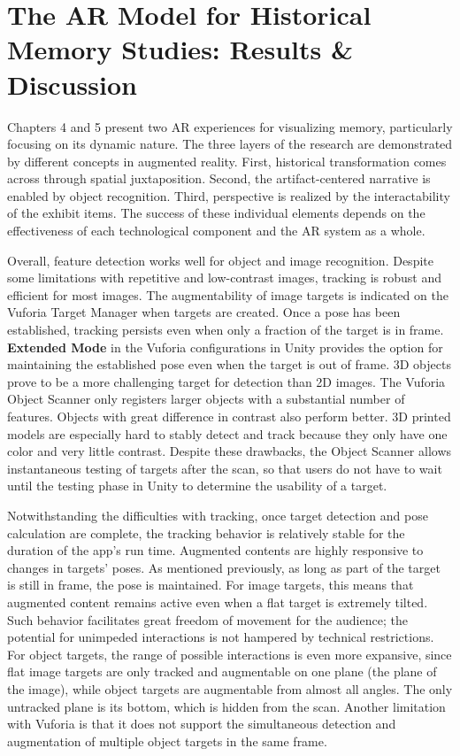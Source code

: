\chapter[The AR Model for Historical Memory Studies]{The AR Model for Historical Memory Studies: Results \& Discussion}\label{results}
Chapters 4 and 5 present two AR experiences for visualizing memory, particularly focusing on its dynamic nature. The three layers of the research are demonstrated by different concepts in augmented reality. First, historical transformation comes across through spatial juxtaposition. Second, the artifact-centered narrative is enabled by object recognition. Third, perspective is realized by the interactability of the exhibit items. The success of these individual elements depends on the effectiveness of each technological component and the AR system as a whole.

Overall, feature detection works well for object and image recognition. Despite some limitations with repetitive and low-contrast images, tracking is robust and efficient for most images. The augmentability of image targets is indicated on the Vuforia Target Manager when targets are created. Once a pose has been established, tracking persists even when only a fraction of the target is in frame. \textbf{Extended Mode} in the Vuforia configurations in Unity provides the option for maintaining the established pose even when the target is out of frame. 3D objects prove to be a more challenging target for detection than 2D images. The Vuforia Object Scanner only registers larger objects with a substantial number of features. Objects with great difference in contrast also perform better. 3D printed models are especially hard to stably detect and track because they only have one color and very little contrast. Despite these drawbacks, the Object Scanner allows instantaneous testing of targets after the scan, so that users do not have to wait until the testing phase in Unity to determine the usability of a target.

Notwithstanding the difficulties with tracking, once target detection and pose calculation are complete, the tracking behavior is relatively stable for the duration of the app's run time. Augmented contents are highly responsive to changes in targets' poses. As mentioned previously, as long as part of the target is still in frame, the pose is maintained. For image targets, this means that augmented content remains active even when a flat target is extremely tilted. Such behavior facilitates great freedom of movement for the audience; the potential for unimpeded interactions is not hampered by technical restrictions. For object targets, the range of possible interactions is even more expansive, since flat image targets are only tracked and augmentable on one plane (the plane of the image), while object targets are augmentable from almost all angles. The only untracked plane is its bottom, which is hidden from the scan. Another limitation with Vuforia is that it does not support the simultaneous detection and augmentation of multiple object targets in the same frame.

